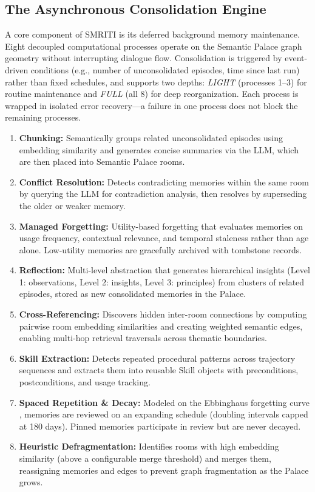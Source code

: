 \documentclass[conference]{IEEEtran}
\begin{document}
\subsection{The Asynchronous Consolidation Engine}
A core component of SMRITI is its deferred background memory maintenance. Eight decoupled computational processes operate on the Semantic Palace graph geometry without interrupting dialogue flow. Consolidation is triggered by event-driven conditions (e.g., number of unconsolidated episodes, time since last run) rather than fixed schedules, and supports two depths: \textit{LIGHT} (processes 1--3) for routine maintenance and \textit{FULL} (all 8) for deep reorganization. Each process is wrapped in isolated error recovery---a failure in one process does not block the remaining processes.
\begin{enumerate}
    \item \textbf{Chunking:} Semantically groups related unconsolidated episodes using embedding similarity and generates concise summaries via the LLM, which are then placed into Semantic Palace rooms.
    \item \textbf{Conflict Resolution:} Detects contradicting memories within the same room by querying the LLM for contradiction analysis, then resolves by superseding the older or weaker memory.
    \item \textbf{Managed Forgetting:} Utility-based forgetting that evaluates memories on usage frequency, contextual relevance, and temporal staleness rather than age alone. Low-utility memories are gracefully archived with tombstone records.
    \item \textbf{Reflection:} Multi-level abstraction that generates hierarchical insights (Level 1: observations, Level 2: insights, Level 3: principles) from clusters of related episodes, stored as new consolidated memories in the Palace.
    \item \textbf{Cross-Referencing:} Discovers hidden inter-room connections by computing pairwise room embedding similarities and creating weighted semantic edges, enabling multi-hop retrieval traversals across thematic boundaries.
    \item \textbf{Skill Extraction:} Detects repeated procedural patterns across trajectory sequences and extracts them into reusable Skill objects with preconditions, postconditions, and usage tracking.
    \item \textbf{Spaced Repetition \& Decay:} Modeled on the Ebbinghaus forgetting curve \cite{ebbinghaus1913memory}, memories are reviewed on an expanding schedule (doubling intervals capped at 180 days). Pinned memories participate in review but are never decayed.
    \item \textbf{Heuristic Defragmentation:} Identifies rooms with high embedding similarity (above a configurable merge threshold) and merges them, reassigning memories and edges to prevent graph fragmentation as the Palace grows.
\end{enumerate}
\end{document}
